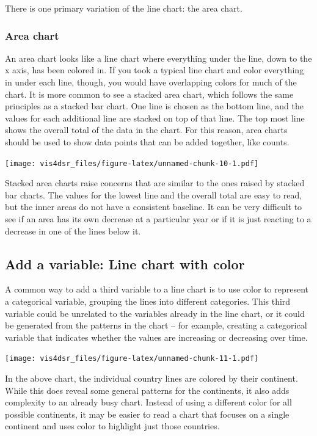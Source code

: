 \documentclass[
]{krantz}
\begin{document}
There is one primary variation of the line chart: the area chart.

\hypertarget{area-chart}{%
\subsubsection{Area chart}\label{area-chart}}

An area chart looks like a line chart where everything under the line, down to the
x axis, has been colored in. If you took a typical line chart and color everything
in under each line, though, you would have overlapping colors for much of the chart.
It is more common to see a stacked area chart, which follows the same principles as
a stacked bar chart. One line is chosen as the bottom line, and the values for
each additional line are stacked on top of that line. The top most line shows the
overall total of the data in the chart. For this reason, area charts should be used
to show data points that can be added together, like counts.

\texttt{[image: vis4dsr\_files/figure-latex/unnamed-chunk-10-1.pdf]}

Stacked area charts raise concerns that are similar to the ones raised by stacked
bar charts. The values for the lowest line and the overall total are easy to
read, but the inner areas do not have a consistent baseline. It can be very difficult
to see if an area has its own decrease at a particular year or if it is just
reacting to a decrease in one of the lines below it.

\hypertarget{add-a-variable-line-chart-with-color}{%
\subsection{Add a variable: Line chart with color}\label{add-a-variable-line-chart-with-color}}

A common way to add a third variable to a line chart is to use color to represent
a categorical variable, grouping the lines into different categories. This third
variable could be unrelated to the variables already in the line chart, or it
could be generated from the patterns in the chart -- for example, creating a
categorical variable that indicates whether the values are increasing or decreasing
over time.

\texttt{[image: vis4dsr\_files/figure-latex/unnamed-chunk-11-1.pdf]}

In the above chart, the individual country lines are colored by their continent.
While this does reveal some general patterns for the continents, it also adds
complexity to an already busy chart. Instead of using a different color
for all possible continents, it may be easier to read a chart that focuses on a
single continent and uses color to highlight just those countries.
\end{document}
